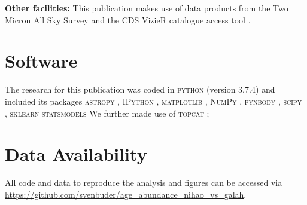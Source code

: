 \documentclass[fleqn,usenatbib]{mnras}
\begin{document}
\textbf{Other facilities:} This publication makes use of data products from the Two Micron All Sky Survey \citep{Skrutskie2006} and the CDS VizieR catalogue access tool \citep{Vizier2000}.

\section*{Software}

The research for this publication was coded in \textsc{python} (version 3.7.4) and included its packages
\textsc{astropy} \citep[v. 3.2.2;][]{Robitaille2013,PriceWhelan2018},
\textsc{IPython} \citep[v. 7.8.0;][]{ipython},
\textsc{matplotlib} \citep[v. 3.1.3;][]{matplotlib},
\textsc{NumPy} \citep[v. 1.17.2;][]{numpy},
\textsc{pynbody} \citep[v. 1.1.0;][]{pynbody},
\textsc{scipy} \citep[v. 1.3.1;][]{Scipy},
\textsc{sklearn} \citep[v. 1.5.1][]{scikit-learn}
\textsc{statsmodels} \citep[v. 0.14.2][]{statsmodels}
We further made use of \textsc{topcat} \citep[version 4.7;][]{Taylor2005};

\section*{Data Availability}

All code and data to reproduce the analysis and figures can be accessed via \url{https://github.com/svenbuder/age_abundance_nihao_vs_galah}.









\bsp	%
\label{lastpage}
\end{document}
